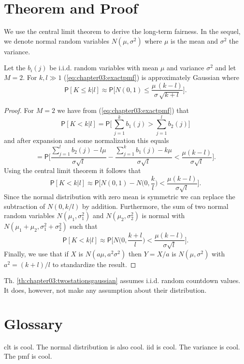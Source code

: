 \section{Theorem and Proof}
\label{sec:chapter03:theorem}
We use the central limit theorem to derive the long-term fairness. In the sequel, we denote normal random variables $N(\mu,\sigma^2)$ where $\mu$ is the mean and $\sigma^2$ the variance.
%
\begin{Theorem}
\label{th:chapter03:twostationsgaussian}
%
Let the $b_i(j)$ be i.i.d. random variables with mean $\mu$ and variance $\sigma^2$ and let $M=2$. For $k,l \gg 1$ (\ref{eq:chapter03:exactpmf}) is approximately Gaussian where
%
\begin{equation*}
\mathsf{P}[K \!\le\! k|l] \approx \mathsf{P}\biggl[ N(0,1) \le \frac{\mu\,(k-l)}{\sigma\,\sqrt{k+l}} \biggr] .
\end{equation*}
%
\end{Theorem}
%
\begin{proof}
%
For $M=2$ we have from (\ref{eq:chapter03:exactpmf}) that
%
\begin{equation*}
\mathsf{P}[K \!<\! k|l] = \mathsf{P} \Biggl[\, \sum_{j=1}^k b_1(j) > \sum_{j=1}^l b_2(j) \Biggr]
\end{equation*}
%
and after expansion and some normalization this equals
%
\begin{equation*}
= \mathsf{P}\Biggl[ \frac{\sum_{j=1}^{l}b_2(j) - l\mu}{\sigma\sqrt{l}} - \frac{\sum_{j=1}^{k}b_1(j) - k\mu}{\sigma\sqrt{l}} < \frac{\mu(k-l)}{\sigma\sqrt{l}} \Biggr].
\end{equation*}
%
Using the central limit theorem it follows that
%
\begin{equation*}
\mathsf{P}[K \!<\! k|l] \approx \mathsf{P} \biggl[ N(0,1) - N \biggl(0,\frac{k}{l}\biggr) < \frac{\mu(k-l)}{\sigma\sqrt{l}} \biggr] .
\end{equation*}
%
Since the normal distribution with zero mean is symmetric we can replace the subtraction of $N(0,k/l)$ by addition. Furthermore, the sum of two normal random variables $N(\mu_1, \sigma_1^2)$ and $N(\mu_2, \sigma_2^2)$ is normal with $N(\mu_1+\mu_2, \sigma_1^2+ \sigma_2^2)$ such that
%
\begin{equation*}
\mathsf{P}[K \!<\! k|l] \approx \mathsf{P} \biggl[ N\biggl(0,\frac{k+l}{l}\biggr) < \frac{\mu(k-l)}{\sigma\sqrt{l}} \biggr] .
\end{equation*}
%
Finally, we use that if $X$ is $N(a\mu,a^2\sigma^2)$ then $Y = X/a$ is $N(\mu,\sigma^2)$ with $a^2 = (k+l)/l$ to standardize the result.
%
\end{proof}

Th. \ref{th:chapter03:twostationsgaussian} assumes i.i.d. random countdown values. It does, however, not make any assumption about their distribution.


%
%
\section{Glossary}
\gls{clt} is cool. The \gls{normal} distribution is also cool. \gls{iid} is cool. The \gls{variance} is cool. The \gls{pmf} is cool.
